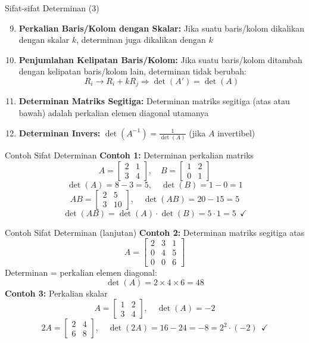 \documentclass{beamer}
\begin{document}
\begin{frame}[t,fragile]{Sifat-sifat Determinan (3)}
\begin{enumerate}
\setcounter{enumi}{8}
\item \textbf{Perkalian Baris/Kolom dengan Skalar:} Jika suatu baris/kolom dikalikan dengan skalar $k$, determinan juga dikalikan dengan $k$
\item \textbf{Penjumlahan Kelipatan Baris/Kolom:} Jika suatu baris/kolom ditambah dengan kelipatan baris/kolom lain, determinan tidak berubah:
$$ R_i \rightarrow R_i + kR_j \Rightarrow \det(A') = \det(A) $$
\item \textbf{Determinan Matriks Segitiga:} Determinan matriks segitiga (atas atau bawah) adalah perkalian elemen diagonal utamanya
\item \textbf{Determinan Invers:} $\det(A^{-1}) = \frac{1}{\det(A)}$ (jika $A$ invertibel)
\end{enumerate}
\end{frame}

\begin{frame}[t,fragile]{Contoh Sifat Determinan}
\textbf{Contoh 1:} Determinan perkalian matriks
$$ A = \begin{bmatrix} 2 & 1 \\ 3 & 4 \end{bmatrix}, \quad B = \begin{bmatrix} 1 & 2 \\ 0 & 1 \end{bmatrix} $$
$$ \det(A) = 8 - 3 = 5, \quad \det(B) = 1 - 0 = 1 $$
$$ AB = \begin{bmatrix} 2 & 5 \\ 3 & 10 \end{bmatrix}, \quad \det(AB) = 20 - 15 = 5 $$
$$ \det(AB) = \det(A) \cdot \det(B) = 5 \cdot 1 = 5 ~~ \checkmark $$
\end{frame}

\begin{frame}[t,fragile]{Contoh Sifat Determinan (lanjutan)}
\textbf{Contoh 2:} Determinan matriks segitiga atas
$$ A = \begin{bmatrix}
       	2 & 3 & 1 \\
	    0 & 4 & 5 \\
	    0 & 0 & 6
        \end{bmatrix} $$
Determinan = perkalian elemen diagonal:
$$ \det(A) = 2 \times 4 \times 6 = 48 $$
\vspace{0.3cm}
\textbf{Contoh 3:} Perkalian skalar
$$ A = \begin{bmatrix} 1 & 2 \\ 3 & 4 \end{bmatrix}, \quad \det(A) = -2 $$
$$ 2A = \begin{bmatrix} 2 & 4 \\ 6 & 8 \end{bmatrix}, \quad \det(2A) = 16 - 24 = -8 = 2^2 \cdot (-2) ~~ \checkmark $$
\end{frame}
\end{document}
